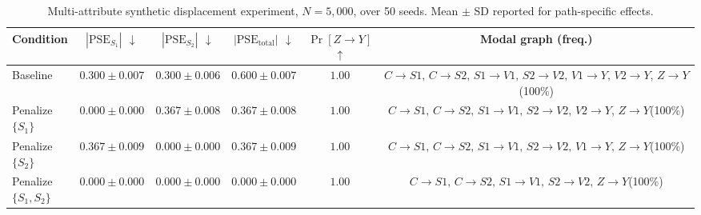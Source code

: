 \begin{table}[t]
\centering
\caption{Multi-attribute synthetic displacement experiment, $N=5{,}000$, over 50 seeds. Mean $\pm$ SD reported for path-specific effects.}
\label{tab:synthetic_displacement}
\renewcommand{\arraystretch}{1.15}
\small
\setlength{\tabcolsep}{3pt}
\begin{tabular}{@{}l c c c c c@{}}
\toprule
\textbf{Condition}
  & \textbf{$|\mathrm{PSE}_{S_1}|$} $\downarrow$
  & \textbf{$|\mathrm{PSE}_{S_2}|$} $\downarrow$
  & \textbf{$|\mathrm{PSE}_{\mathrm{total}}|$} $\downarrow$
  & \textbf{$\Pr[Z{\to}Y]$} $\uparrow$
  & \textbf{Modal graph (freq.)} \\
\midrule
Baseline
  & $0.300{\pm}0.007$
  & $0.300{\pm}0.006$
  & $0.600{\pm}0.007$
  & $1.00$
  & $C{\to}S1,\, C{\to}S2,\, S1{\to}V1,\, S2{\to}V2,\, V1{\to}Y,\, V2{\to}Y,\, Z{\to}Y$\;\;(100\%) \\
Penalize $\{S_1\}$
  & $0.000{\pm}0.000$
  & $0.367{\pm}0.008$
  & $0.367{\pm}0.008$
  & $1.00$
  & $C{\to}S1,\, C{\to}S2,\, S1{\to}V1,\, S2{\to}V2,\, V2{\to}Y,\, Z{\to}Y$\;\;(100\%) \\
Penalize $\{S_2\}$
  & $0.367{\pm}0.009$
  & $0.000{\pm}0.000$
  & $0.367{\pm}0.009$
  & $1.00$
  & $C{\to}S1,\, C{\to}S2,\, S1{\to}V1,\, S2{\to}V2,\, V1{\to}Y,\, Z{\to}Y$\;\;(100\%) \\
Penalize $\{S_1,S_2\}$
  & $0.000{\pm}0.000$
  & $0.000{\pm}0.000$
  & $0.000{\pm}0.000$
  & $1.00$
  & $C{\to}S1,\, C{\to}S2,\, S1{\to}V1,\, S2{\to}V2,\, Z{\to}Y$\;\;(100\%) \\
\bottomrule
\end{tabular}
\end{table}
